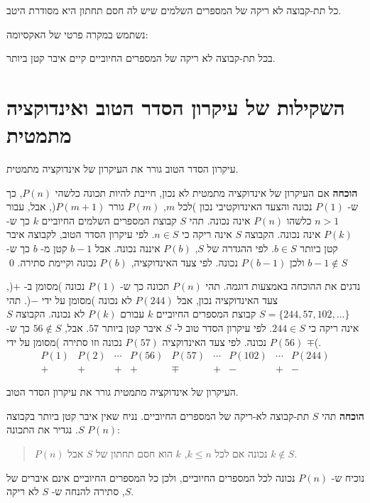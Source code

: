 \begin{axiom}
כל תת-קבוצה לא ריקה של המספרים השלמים שיש לה חסם תחתון היא מסודרת היטב.
\end{axiom}
נשתמש במקרה פרטי של האקסיומה:
\begin{axiom}
בכל תת-קבוצה לא ריקה של המספרים החיוביים קיים איבר קטן ביותר.
\end{axiom}


\section{%
השקילות של עיקרון הסדר הטוב ואינדוקציה מתמטית%
}

\begin{theorem}\label{th.wop}
עיקרון הסדר הטוב גורר את העיקרון של אינדוקציה מתמטית.
\end{theorem}

\textbf{הוכחה}
אם העיקרון של אינדוקציה מתמטית לא נכון, חייבת להיות תכונה כלשהי
$P(n)$,
כך ש-%
$P(1)$
נכונה והצעד האינדוקטיבי נכון )לכל
$m$, $P(m)$
גורר
$P(m+1)$(,
אבל, עבור
$n>1$
כלשהו
$P(n)$
אינה נכונה. תהי
$S$
קבוצת המספרים השלמים החיוביים
$k$
כך ש-%
$P(k)$
אינה נכונה. הקבוצה
$S$
אינה ריקה כי
$n\in S$.
לפי עיקרון הסדר הטוב, לקבוצה איבר קטן ביותר
$b\in S$.
לפי ההגדרה של
$S$, $P(b)$
איננה נכונה. אבל
$b-1$
קטן מ-%
$b$
כך ש-%
$b-1\not\in S$
ולכן
$P(b-1)$
נכונה. לפי צעד האינדוקציה,
$P(b)$
נכונה וקיימת סתירה.
\qed

נדגים את ההוכחה באמצעות דוגמה. תהי 
$P(n)$
תכונה כך ש-%
$P(1)$
נכונה )מסומן ב-%
$+$(, 
צעד האינדוקציה נכון, אבל
$P(244)$
לא נכונה )מסומן על ידי
$-$(.
תהי
$S=\{244,57,102,\ldots\}$
קבוצת המספרים החיוביים
$k$
עבורם
$P(k)$
לא נכונה. הקבוצה
$S$
אינה ריקה כי
$244\in S$.
לפי עיקרון הסדר טוב ל-%
$S$
איבר קטן ביותר
$57$.
אבל,
$56\not\in S$
כך ש-%
$P(56)$
נכונה. לפי צעד האינדוקציה
$P(57)$
נכונה וזו סתירה )מסומן על ידי
$\mp$(.
\[
\begin{array}{ccccccccc}
P(1) & P(2) & \cdots & P(56) & P(57) & \cdots & P(102) & \cdots & P(244)\\
+ & + & + & + & \mp & + & -&+&-
\end{array}
\]

\vspace{-3ex}

\begin{theorem}
העיקרון של אינדוקציה מתמטית גורר את עיקרון הסדר הטוב.
\end{theorem}

\textbf{הוכחה} 
תהי
$S$
תת-קבוצה לא-ריקה של המספרים החיוביים. נניח שאין איבר קטן ביותר בקבוצה 
$S$.
נגדיר את התכונה
$P(n)$:
\begin{quote}
$P(n)$
נכונה אם לכל 
$k\leq n$, $k$
הוא  חסם תחתון של
$S$
אבל
$k\not\in S$.
\end{quote}
נוכיח ש-%
$P(n)$
נכונה לכל המספרים החיוביים, ולכן כל המספרים החיוביים אינם איברים של
$S$,
סתירה להנחה ש-%
$S$
לא ריקה.

